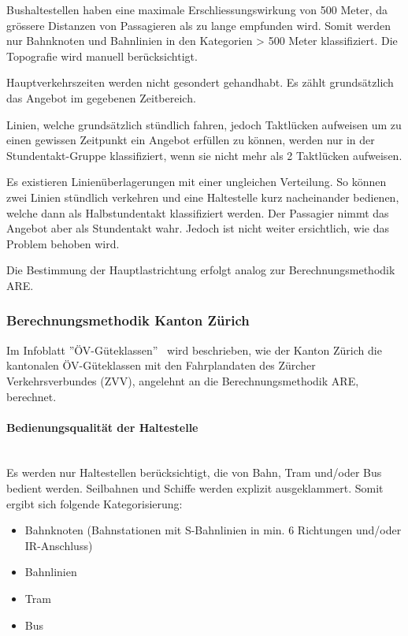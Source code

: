 Bushaltestellen haben eine maximale Erschliessungswirkung von 500 Meter, da grössere Distanzen von Passagieren als zu lange empfunden wird.
Somit werden nur Bahnknoten und Bahnlinien in den Kategorien > 500 Meter klassifiziert.
Die Topografie wird manuell berücksichtigt.

Hauptverkehrszeiten werden nicht gesondert gehandhabt.
Es zählt grundsätzlich das Angebot im gegebenen Zeitbereich.

Linien, welche grundsätzlich stündlich fahren, jedoch Taktlücken aufweisen um zu einen gewissen Zeitpunkt ein Angebot erfüllen zu können, werden nur in der Stundentakt-Gruppe klassifiziert, wenn sie nicht mehr als 2 Taktlücken aufweisen.

Es existieren Linienüberlagerungen mit einer ungleichen Verteilung.
So können zwei Linien stündlich verkehren und eine Haltestelle kurz nacheinander bedienen, welche dann als Halbstundentakt klassifiziert werden.
Der Passagier nimmt das Angebot aber als Stundentakt wahr.
Jedoch ist nicht weiter ersichtlich, wie das Problem behoben wird.

Die Bestimmung der Hauptlastrichtung erfolgt analog zur Berechnungsmethodik ARE.


\subsubsection{Berechnungsmethodik Kanton Zürich}
\label{Lösungsansätze:Berechnungsmethodik Kanton Zürich}
Im Infoblatt ''ÖV-Güteklassen''~\cite{oev-guteklassen-zh} wird beschrieben, wie der Kanton Zürich die kantonalen ÖV-Güteklassen mit den Fahrplandaten des Zürcher Verkehrsverbundes (ZVV), angelehnt an die Berechnungsmethodik \acs{ARE}, berechnet.

\paragraph{Bedienungsqualität der Haltestelle}~\\
\label{Berechnungsmethodik Kanton Zürich:Bedienungsqualität der Haltestelle}
Es werden nur Haltestellen berücksichtigt, die von Bahn, Tram und/oder Bus bedient werden.
Seilbahnen und Schiffe werden explizit ausgeklammert.
Somit ergibt sich folgende Kategorisierung:
\begin{itemize}
    \itemsep -1.5em
    \item Bahnknoten (Bahnstationen mit S-Bahnlinien in min. 6 Richtungen und/oder IR-Anschluss)
    \item Bahnlinien
    \item Tram
    \item Bus
\end{itemize}

